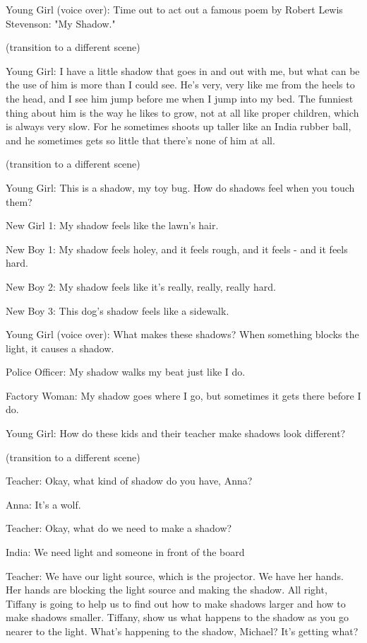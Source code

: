 Young Girl (voice over): Time out to act out a famous poem by Robert Lewis Stevenson: "My Shadow."

(transition to a different scene)

Young Girl: I have a little shadow that goes in and out with me, but what can be the use of him is more than I could see. He's very, very like me from the heels to the head, and I see him jump before me when I jump into my bed. The funniest thing about him is the way he likes to grow, not at all like proper children, which is always very slow. For he sometimes shoots up taller like an India rubber ball, and he sometimes gets so little that there's none of him at all.

(transition to a different scene)

Young Girl: This is a shadow, my toy bug. How do shadows feel when you touch them?

New Girl 1: My shadow feels like the lawn's hair.

New Boy 1: My shadow feels holey, and it feels rough, and it feels - and it feels hard.

New Boy 2: My shadow feels like it's really, really, really hard.

New Boy 3: This dog's shadow feels like a sidewalk.

Young Girl (voice over): What makes these shadows? When something blocks the light, it causes a shadow.

Police Officer: My shadow walks my beat just like I do.

Factory Woman: My shadow goes where I go, but sometimes it gets there before I do.

Young Girl: How do these kids and their teacher make shadows look different?

(transition to a different scene)

Teacher: Okay, what kind of shadow do you have, Anna?

Anna: It's a wolf.

Teacher: Okay, what do we need to make a shadow?

India: We need light and someone in front of the board

Teacher: We have our light source, which is the projector. We have her hands. Her hands are blocking the light source and making the shadow. All right, Tiffany is going to help us to find out how to make shadows larger and how to make shadows smaller. Tiffany, show us what happens to the shadow as you go nearer to the light. What's happening to the shadow, Michael? It's getting what?

